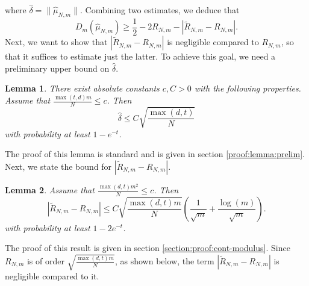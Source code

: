 \documentclass[12pt]{article}
\newcommand{\wh}{\widehat}
\def\l{\left}
\def\r{\right}
\newtheorem{lemma}{Lemma}
\theoremstyle{thmstyletwo}%
\theoremstyle{thmstylethree}%
\begin{document}
where $\wh\delta = \|\wh \mu_{N,m}\|$. Combining two estimates, we deduce that 
\begin{equation}
\label{eq:depth}
D_m(\wh\mu_{N,m}) \geq \frac12 - 2R_{N,m} - \l|\tilde R_{N,m}-R_{N,m}\r|.
\end{equation}
Next, we want to show that $\l|\tilde R_{N,m}-R_{N,m}\r|$ is negligible compared to $R_{N,m}$, so that it suffices to estimate just the latter. 
To achieve this goal, we need a preliminary upper bound on $\wh \delta$.
\begin{lemma}
    \label{lemma:prelim}
There exist absolute constants $c,C>0$ with the following properties. Assume that $\frac{\max(t,d)m}{N}\leq c$. Then 
\[
\hat \delta \leq C\sqrt{\frac{\max(d,t)}{N}}
\]
with probability at least $1-e^{-t}$.
\end{lemma}
\noindent The proof of this lemma is standard and is given in section \ref{proof:lemma:prelim}.
Next, we state the bound for $\l|\tilde R_{N,m}-R_{N,m}\r|$. 
\begin{lemma}
\label{lemma:cont-modulus}
Assume that $\frac{\max(d,t)m^2}{N}\leq c$. Then 
\[
\l|\tilde R_{N,m}-R_{N,m}\r| 
        \leq C\sqrt{\frac{\max(d,t)m}{N}}\l( \frac{1}{\sqrt m} + \frac{\log(m)}{\sqrt m} \r).
\]
with probability at least $1-2e^{-t}$.
\end{lemma}
\noindent The proof of this result is given in section \ref{section:proof:cont-modulus}. Since $R_{N,m}$ is of order $\sqrt{\frac{\max(d,t)m}{N}}$, as shown below, the term $\l|\tilde R_{N,m}-R_{N,m}\r|$ is negligible compared to it. 
\end{document}
